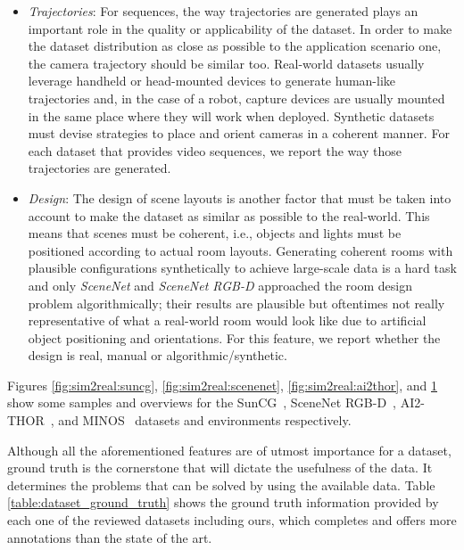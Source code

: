 \begin{itemize}
\begin{figure}[!htb]
    \label{fig:sim2real:minos}
  \end{figure}
  \item \emph{Trajectories}: For sequences, the way trajectories are generated plays an important role in the quality or applicability of the dataset. In order to make the dataset distribution as close as possible to the application scenario one, the camera trajectory should be similar too. Real-world datasets usually leverage handheld or head-mounted devices to generate human-like trajectories and, in the case of a robot, capture devices are usually mounted in the same place where they will work when deployed. Synthetic datasets must devise strategies to place and orient cameras in a coherent manner. For each dataset that provides video sequences, we report the way those trajectories are generated.
  \item \emph{Design}: The design of scene layouts is another factor that must be taken into account to make the dataset as similar as possible to the real-world. This means that scenes must be coherent, i.e., objects and lights must be positioned according to actual room layouts. Generating coherent rooms with plausible configurations synthetically to achieve large-scale data is a hard task and only \emph{SceneNet}\cite{Handa2015} and \emph{SceneNet RGB-D}\cite{McCormac2017} approached the room design problem algorithmically; their results are plausible but oftentimes not really representative of what a real-world room would look like due to artificial object positioning and orientations. For this feature, we report whether the design is real, manual or algorithmic/synthetic.
\end{itemize}

Figures \ref{fig:sim2real:suncg}, \ref{fig:sim2real:scenenet}, \ref{fig:sim2real:ai2thor}, and \ref{fig:sim2real:minos} show some samples and overviews for the SunCG~\cite{Song2016}, SceneNet RGB-D~\cite{Handa2015}, AI2-THOR~\cite{Kolve2017}, and MINOS~\cite{Savva2017} datasets and environments respectively.

Although all the aforementioned features are of utmost importance for a dataset, ground truth is the cornerstone that will dictate the usefulness of the data. It determines the problems that can be solved by using the available data.  Table \ref{table:dataset_ground_truth} shows the ground truth information provided by each one of the reviewed datasets including ours, which completes and offers more annotations than the state of the art.

